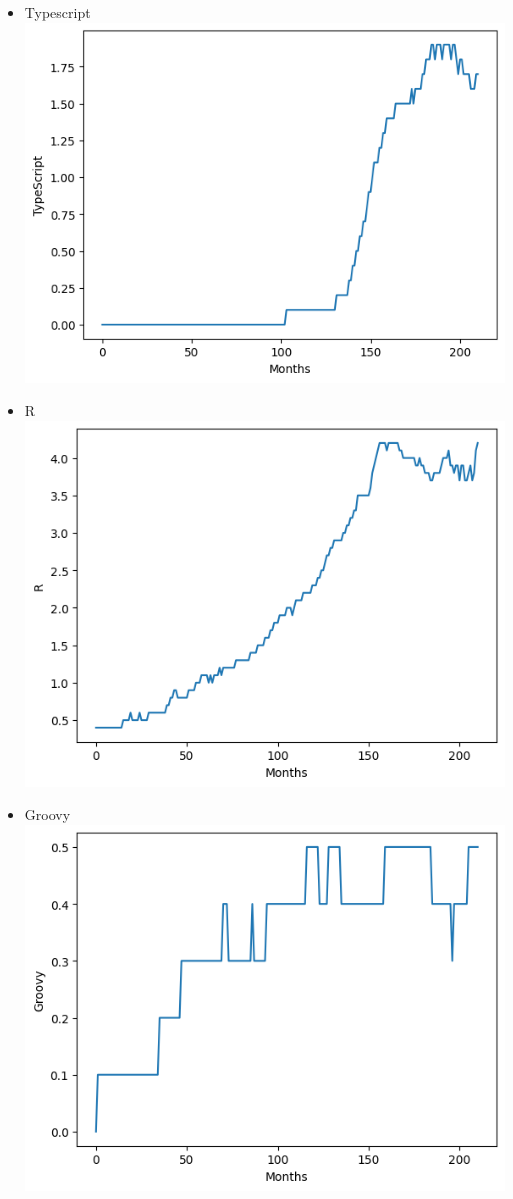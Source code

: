 \documentclass[conference]{IEEEtran}
\begin{document}
\begin{itemize}
\item{Typescript}
\includegraphics[scale=0.4]{lineplot/typescript.png}
\item{R}
\includegraphics[scale=0.4]{lineplot/r.png}
\item{Groovy}
\includegraphics[scale=0.4]{lineplot/groovy.png}

\end{itemize}
\end{document}
